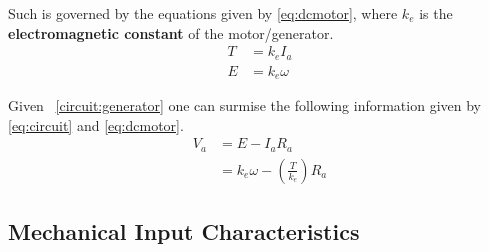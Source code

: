 \documentclass[conference]{ieeetran}
\newcommand{\figref}[1]{\figurename~\ref{#1}}
\begin{document}
Such is governed by the equations given by \eqref{eq:dcmotor}, where $k_e$ is the \textbf{electromagnetic constant} of the motor/generator.
\begin{equation}
    \label{eq:dcmotor}
    \begin{aligned}
        T &= k_e I_a\\
        E &= k_e \omega
    \end{aligned}
\end{equation}

Given \figref{circuit:generator} one can surmise the following information given by \eqref{eq:circuit} and \eqref{eq:dcmotor}.
\begin{equation}
    \label{eq:circuit}
    \begin{aligned}
        V_a &= E - I_aR_a\\
        &= k_e\omega - \left(\frac{T}{k_e}\right)R_a
    \end{aligned}
\end{equation}

\subsection{Mechanical Input Characteristics}

\medskip


\end{document}
